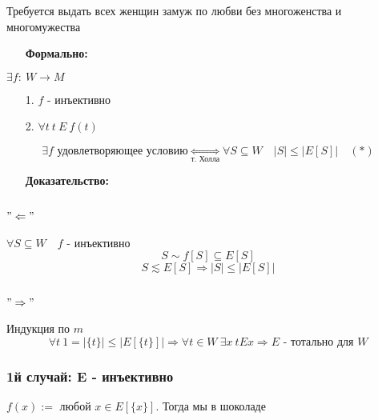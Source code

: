 \documentclass[12pt, letterpaper, twoside]{article}
\begin{document}
Требуется выдать всех женщин замуж по любви без многоженства и многомужества\\
\begin{enumerate}
    \item[\textbf{Формально:}]
\end{enumerate}
$\exists f:\ W\rightarrow M$
\begin{enumerate}
    \item [1.] $f$ - инъективно
    \item [2.] $\forall t\ t\ E\ f(t)$
\end{enumerate}
$$\exists f\text{ удовлетворяющее условию} \underset{\text{т. Холла}}{\Longleftrightarrow} \forall S\subseteq W\quad |S| \leq \Big|E[S]\Big|\quad (*)$$\newpage
\begin{enumerate}
    \item[\textbf{Доказательство:}]
\end{enumerate}
\subsection*{$"\Leftarrow"$}
$\forall S\subseteq W\quad f$ -  инъективно
$$S\sim f[S]\subseteq E[S]$$
$$S\lesssim E[S]\Rightarrow |S| \leq |E[S]|$$
\subsection*{$"\Rightarrow"$}
Индукция по $m$
$$\forall t\ 1 = |\{ t \}| \leq |E[\{ 
t \}]|\Rightarrow \forall t\in W\ \exists x\ tEx\Rightarrow E\text{ - тотально для }W$$
\subsubsection*{1й случай: E - инъективно}
$f(x) := $ любой $x\in E[\{x\}]$. Тогда мы в шоколаде
\end{document}
